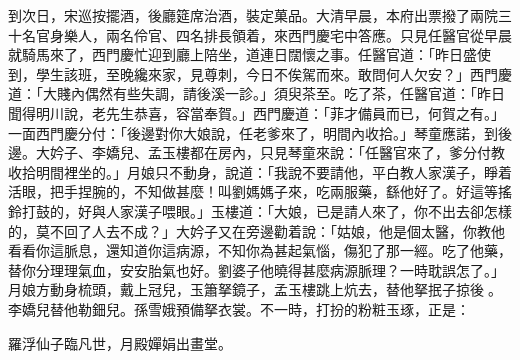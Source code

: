 到次日，宋巡按擺酒，後廳筵席治酒，裝定菓品。大清早晨，本府出票撥了兩院三十名官身樂人，兩名伶官、四名排長領着，來西門慶宅中答應。只見任醫官從早晨就騎馬來了，西門慶忙迎到廳上陪坐，道連日闊懷之事。任醫官道：「昨日盛使到，學生該班，至晚纔來家，見尊刺，今日不俟駕而來。敢問何人欠安？」西門慶道：「大賤內偶然有些失調，請後溪一診。」須臾茶至。吃了茶，任醫官道：「昨日聞得明川說，老先生恭喜，容當奉賀。」西門慶道：「菲才備員而已，何賀之有。」一面西門慶分付：「後邊對你大娘說，任老爹來了，明間內收拾。」琴童應諾，到後邊。大妗子、李嬌兒、孟玉樓都在房內，只見琴童來說：「任醫官來了，爹分付教收拾明間裡坐的。」月娘只不動身，說道：「我說不要請他，平白教人家漢子，睜着活眼，把手捏腕的，不知做甚麼！叫劉媽媽子來，吃兩服藥，繇他好了。好這等搖鈴打鼓的，好與人家漢子喂眼。」玉樓道：「大娘，已是請人來了，你不出去卻怎樣的，莫不回了人去不成？」大妗子又在旁邊勸着說：「姑娘，他是個太醫，你教他看看你這脈息，還知道你這病源，不知你為甚起氣惱，傷犯了那一經。吃了他藥，替你分理理氣血，安安胎氣也好。劉婆子他曉得甚麼病源脈理？一時耽誤怎了。」月娘方動身梳頭，戴上冠兒，玉簫拏鏡子，孟玉樓跳上炕去，替他拏抿子掠後𩬆。李嬌兒替他勒鈿兒。孫雪娥預備拏衣裳。{}不一時，打扮的粉粧玉琢，正是：

\begin{myquote} 
羅浮仙子臨凡世，月殿嬋娟出畫堂。
\end{myquote} 

